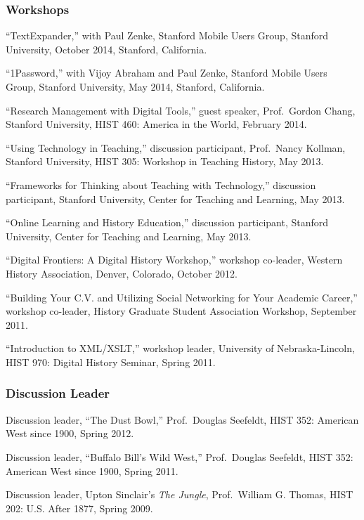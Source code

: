 \hypertarget{workshops}{%
\subsubsection{Workshops}\label{workshops}}

``TextExpander,'' with Paul Zenke, Stanford Mobile Users Group, Stanford
University, October 2014, Stanford, California.

``1Password,'' with Vijoy Abraham and Paul Zenke, Stanford Mobile Users
Group, Stanford University, May 2014, Stanford, California.

``Research Management with Digital Tools,'' guest speaker, Prof.~Gordon
Chang, Stanford University, HIST 460: America in the World, February
2014.

``Using Technology in Teaching,'' discussion participant, Prof.~Nancy
Kollman, Stanford University, HIST 305: Workshop in Teaching History,
May 2013.

``Frameworks for Thinking about Teaching with Technology,'' discussion
participant, Stanford University, Center for Teaching and Learning, May
2013.

``Online Learning and History Education,'' discussion participant,
Stanford University, Center for Teaching and Learning, May 2013.

``Digital Frontiers: A Digital History Workshop,'' workshop co-leader,
Western History Association, Denver, Colorado, October 2012.

``Building Your C.V. and Utilizing Social Networking for Your Academic
Career,'' workshop co-leader, History Graduate Student Association
Workshop, September 2011.

``Introduction to XML/XSLT,'' workshop leader, University of
Nebraska-Lincoln, HIST 970: Digital History Seminar, Spring 2011.

\hypertarget{discussion-leader}{%
\subsubsection{Discussion Leader}\label{discussion-leader}}

Discussion leader, ``The Dust Bowl,'' Prof.~Douglas Seefeldt, HIST 352:
American West since 1900, Spring 2012.

Discussion leader, ``Buffalo Bill's Wild West,'' Prof.~Douglas Seefeldt,
HIST 352: American West since 1900, Spring 2011.

Discussion leader, Upton Sinclair's \emph{The Jungle}, Prof.~William G.
Thomas, HIST 202: U.S. After 1877, Spring 2009.

